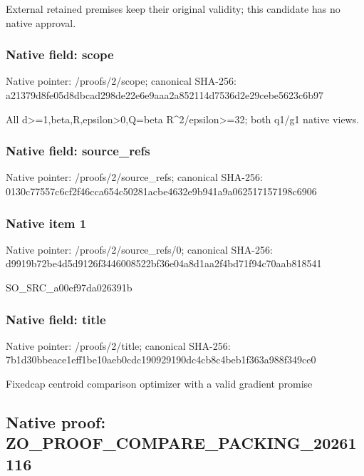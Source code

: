 \documentclass[10pt,a4paper]{article}
\begin{document}
External retained premises keep their original validity; this candidate has no native approval.


\subsubsection{Native field: scope}


Native pointer: /proofs/2/scope; canonical SHA-256: a21379d8fe05d8dbcad298de\allowbreak{}22e6e9aaa2a852114d7536d2\allowbreak{}e29cebe5623c6b97


All d>=1,beta,R,epsilon>0,Q=beta R\textasciicircum{}2/epsilon>=32; both q1/g1 native views.


\subsubsection{Native field: source\_refs}


Native pointer: /proofs/2/source\_refs; canonical SHA-256: 0130c77557c6cf2f46cca654\allowbreak{}c50281acbe4632e9b941a9a0\allowbreak{}62517157198c6906



\subsubsection{Native item 1}


Native pointer: /proofs/2/source\_refs/0; canonical SHA-256: d9919b72be4d5d9126f34460\allowbreak{}08522bf36e04a8d1aa2f4bd7\allowbreak{}1f94c70aab818541


SO\_SRC\_a00ef97da026391b


\subsubsection{Native field: title}


Native pointer: /proofs/2/title; canonical SHA-256: 7b1d30bbeace1eff1be10aeb\allowbreak{}0cdc190929190dc4cb8c4beb\allowbreak{}1f363a988f349ce0


Fixedcap centroid comparison optimizer with a valid gradient promise


\subsection{Native proof: ZO\_PROOF\_COMPARE\_PACKING\_20261116}
\end{document}
